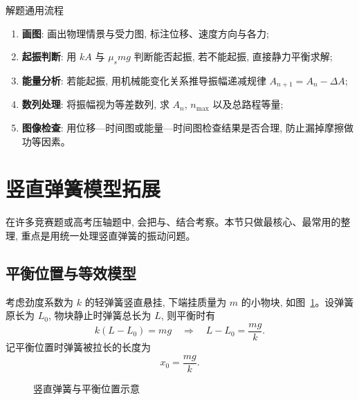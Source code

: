 \documentclass[a4paper,11pt]{ctexart}
\begin{document}
\begin{summarybox}{解题通用流程}
\begin{enumerate}
  \item \textbf{画图}: 画出物理情景与受力图, 标注位移、速度方向与各力;
  \item \textbf{起振判断}: 用 $kA$ 与 $\mu_s mg$ 判断能否起振, 若不能起振, 直接静力平衡求解;
  \item \textbf{能量分析}: 若能起振, 用机械能变化关系推导振幅递减规律 $A_{n+1}=A_n-\Delta A$;
  \item \textbf{数列处理}: 将振幅视为等差数列, 求 $A_n$, $n_{\max}$ 以及总路程等量;
  \item \textbf{图像检查}: 用位移—时间图或能量—时间图检查结果是否合理, 防止漏掉摩擦做功等因素。
\end{enumerate}
\end{summarybox}

\section{竖直弹簧模型拓展}

在许多竞赛题或高考压轴题中, 会把与、结合考察。本节只做最核心、最常用的整理, 重点是用统一处理竖直弹簧的振动问题。

\subsection{平衡位置与等效模型}

考虑劲度系数为 $k$ 的轻弹簧竖直悬挂, 下端挂质量为 $m$ 的小物块, 如图~\ref{fig:vertical-spring}。设弹簧原长为 $L_0$, 物块静止时弹簧总长为 $L$, 则平衡时有
\[
  k(L-L_0)=mg \quad\Rightarrow\quad L-L_0=\frac{mg}{k}.
\]
记平衡位置时弹簧被拉长的长度为
\[
  x_0 = \frac{mg}{k}.
\]

\begin{figure}[htbp]
  \centering
  \caption{竖直弹簧与平衡位置示意}
  \label{fig:vertical-spring}
\end{figure}
\end{document}
